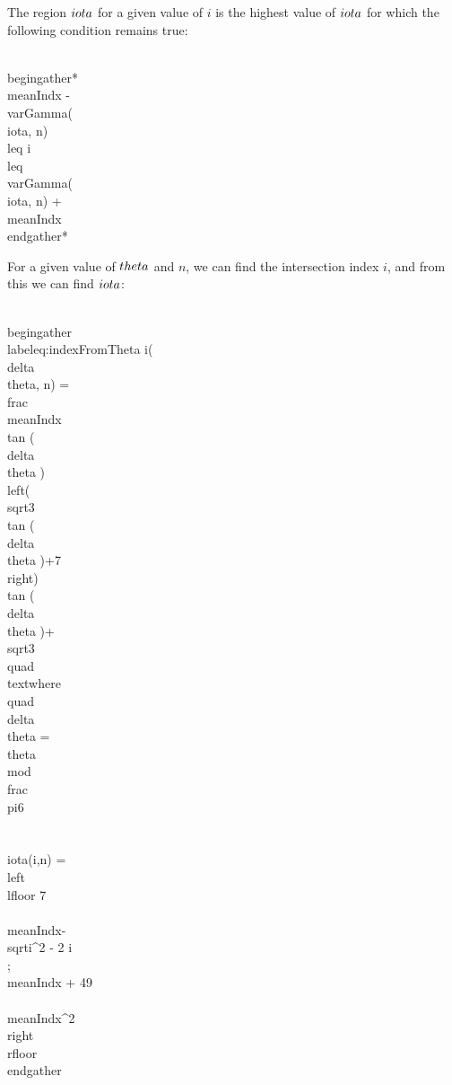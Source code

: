 The region $\\iota$ for a given value of $i$ is the highest value of $\\iota$ for which the following condition remains true:

\\begin{gather*}
\\meanIndx -\\varGamma(\\iota, n) \\leq i \\leq \\varGamma(\\iota, n) + \\meanIndx 
\\end{gather*}

For a given value of $\\theta$ and $n$, we can find the intersection index $i$, and from this we can find $\\iota$:

\\begin{gather}\\label{eq:indexFromTheta}
i(\\delta\\theta, n) = \\frac{\\meanIndx \\tan (\\delta \\theta ) \\left(\\sqrt{3} \\tan (\\delta \\theta )+7\\right)}{\\tan (\\delta \\theta )+\\sqrt{3}} 
\\quad \\text{where} \\quad \\delta\\theta = \\theta \\mod{\\frac{\\pi}{6} }\\\\
 \\iota(i,n)  = \\left\\lfloor 7\\ \\meanIndx-\\sqrt{i^2 - 2 i \\; \\meanIndx + 49\\ \\meanIndx^2 }\\right\\rfloor 
\\end{gather}

